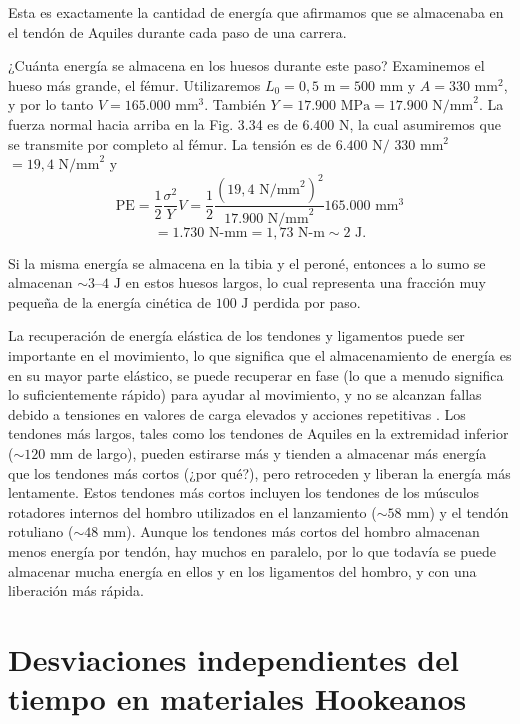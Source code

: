 \documentclass[12pt]{book}
\begin{document}
Esta es exactamente la cantidad de energía que afirmamos que se almacenaba en el tendón de Aquiles durante cada paso de una carrera.

¿Cuánta energía se almacena en los huesos durante este paso? Examinemos el hueso más grande, el fémur. Utilizaremos $L_0 = 0,5\text{ m} = 500\text{ mm}$ y $A = 330\text{ mm}^2$, y por lo tanto $V = 165.000\text{ mm}^3$. También $Y = 17.900\text{ MPa} = 17.900\text{ N/mm}^2$. La fuerza normal hacia arriba en la Fig. 3.34 es de $6.400\text{ N}$, la cual asumiremos que se transmite por completo al fémur. La tensión es de $6.400\text{ N}/$ $330\text{ mm}^2$ $= 19,4\text{ N/mm}^2$ y
\begin{equation}
\text{PE} = \frac{1}{2}\frac{\sigma^2}{Y} V = \frac{1}{2}\frac{(19,4\text{ N/mm}^2)^2}{17.900\text{ N/mm}^2} 165.000\text{ mm}^3
\label{eq:4.20}
\end{equation}
\begin{equation}
= 1.730\text{ N-mm} = 1,73\text{ N-m} \sim 2\text{ J}.
\label{eq:4.21}
\end{equation}

Si la misma energía se almacena en la tibia y el peroné, entonces a lo sumo se almacenan $\sim 3\text{--}4\text{ J}$ en estos huesos largos, lo cual representa una fracción muy pequeña de la energía cinética de $100\text{ J}$ perdida por paso.

La recuperación de energía elástica de los tendones y ligamentos puede ser importante en el movimiento, lo que significa que el almacenamiento de energía es en su mayor parte elástico, se puede recuperar en fase (lo que a menudo significa lo suficientemente rápido) para ayudar al movimiento, y no se alcanzan fallas debido a tensiones en valores de carga elevados y acciones repetitivas \cite{66}. Los tendones más largos, tales como los tendones de Aquiles en la extremidad inferior ($\sim 120\text{ mm}$ de largo), pueden estirarse más y tienden a almacenar más energía que los tendones más cortos (¿por qué?), pero retroceden y liberan la energía más lentamente. Estos tendones más cortos incluyen los tendones de los músculos rotadores internos del hombro utilizados en el lanzamiento ($\sim 58\text{ mm}$) y el tendón rotuliano ($\sim 48\text{ mm}$). Aunque los tendones más cortos del hombro almacenan menos energía por tendón, hay muchos en paralelo, por lo que todavía se puede almacenar mucha energía en ellos y en los ligamentos del hombro, y con una liberación más rápida.

\section{Desviaciones independientes del tiempo en materiales Hookeanos}
\end{document}
